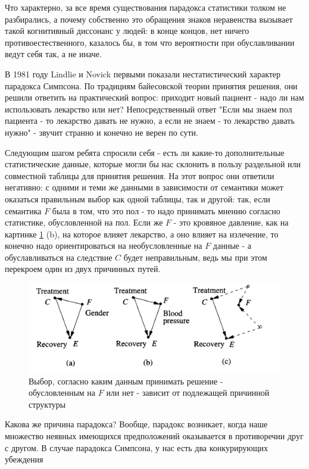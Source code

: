 \documentclass[fleqn]{article}
\numberwithin{equation}{section}
\numberwithin{theorem}{section}
\numberwithin{figure}{section}
\numberwithin{lemma}{section}
\numberwithin{corollary}{section}
\begin{document}
 Что характерно, за все время существования парадокса статистики толком не разбирались, а почему собственно это обращения знаков неравенства вызывает такой когнитивный диссонанс у людей: в конце концов, нет ничего противоестественного, казалось бы, в том что вероятности при обуславливании ведут себя так, а не иначе. 
 
В 1981 году Lindlie и Novick первыми показали нестатистический характер парадокса Симпсона. По традициям байесовской теории принятия решения, они решили ответить на практический вопрос: приходит новый пациент - надо ли нам использовать лекарство или нет? Непосредственный ответ "Если мы знаем пол пациента - то лекарство давать не нужно, а если не знаем - то лекарство давать нужно" - звучит странно и конечно не верен по сути. 

Следующим шагом ребята спросили себя - есть ли какие-то дополнительные статистические данные, которые могли бы нас склонить в пользу раздельной или совместной таблицы для принятия решения. На этот вопрос они ответили негативно: с одними и теми же данными в зависимости от семантики может оказаться правильным выбор как одной таблицы, так и другой: так, если семантика $F$ была в том, что это пол - то надо принимать мнению согласно статистике, обусловленной на пол. Если же $F$ - это кровяное давление, как на картинке \ref{fig:simpson2} (b), на которое влияет лекарство, а оно влияет на излечение, то конечно надо ориентироваться на необусловленные на $F$ данные - а обуславливаться на следствие $C$ будет неправильным, ведь мы при этом перекроем один из двух причинных путей.

\begin{figure}[h]
	\begin{center}
		\includegraphics[scale=0.6]{imgs/img29.png}
	\end{center}
	\caption{Выбор, согласно каким данным принимать решение - обусловленным на $F$ или нет - зависит от подлежащей причинной структуры}
	\label{fig:simpson2}
\end{figure}

Какова же причина парадокса? Вообще, парадокс возникает, когда наше множество неявных имеющихся предположений оказывается в противоречии друг с другом. В случае парадокса Симпсона, у нас есть два конкурирующих убеждения
\end{document}
